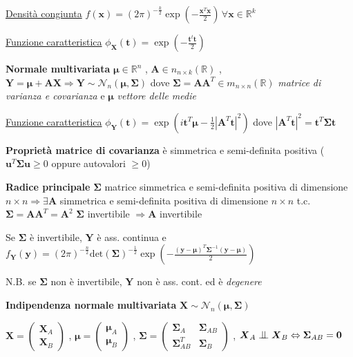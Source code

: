 \documentclass[openany]{book} %
\newcommand{\ind}{\mathrel{\text{\scalebox{1.07}{$\perp\mkern-10mu\perp$}}}}
\begin{document}
\underline{Densità congiunta} $f(\boldsymbol{x})=(2\pi)^{-\frac{k}{2}}\exp(-\frac{\boldsymbol{x}^T \boldsymbol{x}}{2})\,\forall \boldsymbol{x}\in \mathbb{R}^k$

\underline{Funzione caratteristica} $\phi_{\boldsymbol{X}}(\boldsymbol{t})=\exp(-\frac{\boldsymbol{t}^t \boldsymbol{t}}{2})$

\textbf{Normale multivariata} $\boldsymbol{\mu}\in \mathbb{R}^n$ , $\boldsymbol{A}\in n_{n\times k}(\mathbb{R})$ , $\boldsymbol{Y} = \boldsymbol{\mu}+\boldsymbol{AX}\Rightarrow \boldsymbol{Y}\sim \mathcal{N}_n(\boldsymbol{\mu},\boldsymbol{\Sigma})$ dove $\boldsymbol{\Sigma}=\boldsymbol{AA}^T\in m_{n\times n}(\mathbb{R})$ \textit{matrice di varianza e covarianza} e $\boldsymbol{\mu}$ \textit{vettore delle medie}

\underline{Funzione caratteristica} $\phi_{\boldsymbol{Y}}(\boldsymbol{t})=\exp(i \boldsymbol{t}^T \boldsymbol{\mu}-\frac{1}{2}|\boldsymbol{A}^T \boldsymbol{t}|^2)$ dove $|\boldsymbol{A}^T \boldsymbol{t}|^2 = \boldsymbol{t}^T \boldsymbol{\Sigma t}$

\textbf{Proprietà matrice di covarianza} è simmetrica e semi-definita positiva ($\boldsymbol{u}^T \boldsymbol{\Sigma u}\geq 0$ oppure autovalori $\geq 0$)

\textbf{Radice principale} $\boldsymbol{\Sigma}$ matrice simmetrica e semi-definita positiva di dimensione $n\times n \Rightarrow \exists \boldsymbol{A}$ simmetrica e semi-definita positiva di dimensione $n\times n$ t.c. $\boldsymbol{\Sigma}=\boldsymbol{AA}^T=\boldsymbol{A}^2$ \quad $\boldsymbol{\Sigma}$ invertibile $\Rightarrow \boldsymbol{A}$ invertibile

Se $\boldsymbol{\Sigma}$ è invertibile, $\boldsymbol{Y}$ è ass. continua e $f_{\boldsymbol{Y}}(\boldsymbol{y})=(2\pi)^{-\frac{n}{2}}\text{det}(\boldsymbol{\Sigma})^{-\frac{1}{2}}\exp(-\frac{(\boldsymbol{y}-\boldsymbol{\mu})^T \boldsymbol{\Sigma}^{-1}(\boldsymbol{y}-\boldsymbol{\mu})}{2})$

N.B. se $\boldsymbol{\Sigma}$ non è invertibile, $\boldsymbol{Y}$ non è ass. cont. ed è \textit{degenere}

\textbf{Indipendenza normale multivariata} $\boldsymbol{X}\sim \mathcal{N}_n(\boldsymbol{\mu},\boldsymbol{\Sigma})$ 

$\boldsymbol{X}=\left(\begin{array}{c}\boldsymbol{X}_A \\ \boldsymbol{X}_B\end{array}\right)$ , $\boldsymbol{\mu}=\left(\begin{array}{c}\boldsymbol{\mu}_A \\ \boldsymbol{\mu}_B\end{array}\right)$ , $\boldsymbol{\Sigma}=\left(\begin{array}{cc}\boldsymbol{\Sigma}_A & \boldsymbol{\Sigma}_{AB}\\ \boldsymbol{\Sigma}_{AB}^T & \boldsymbol{\Sigma}_B\end{array}\right)$ , $\boldsymbol{X}_A \ind \boldsymbol{X}_B \Leftrightarrow \boldsymbol{\Sigma}_{AB} = \boldsymbol{0}$
\end{document}
